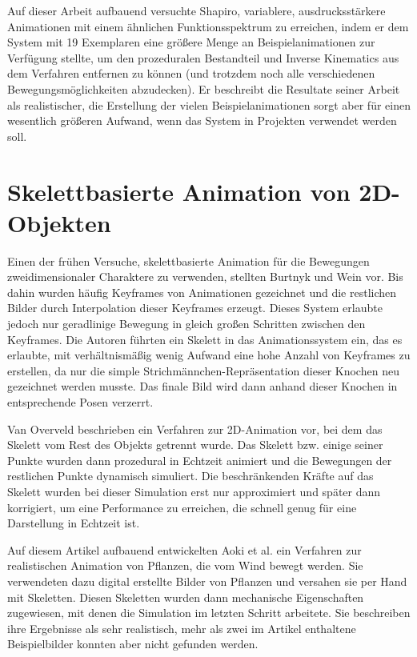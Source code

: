 Auf dieser Arbeit aufbauend versuchte Shapiro\cite{shapiro2011building}, variablere, ausdrucksstärkere Animationen mit einem ähnlichen Funktionsspektrum zu erreichen, indem er dem System mit 19 Exemplaren eine größere Menge an Beispielanimationen zur Verfügung stellte, um den prozeduralen Bestandteil und Inverse Kinematics aus dem Verfahren entfernen zu können (und trotzdem noch alle verschiedenen Bewegungsmöglichkeiten abzudecken). Er beschreibt die Resultate seiner Arbeit als realistischer, die Erstellung der vielen Beispielanimationen sorgt aber für einen wesentlich größeren Aufwand, wenn das System in Projekten verwendet werden soll.

\section{Skelettbasierte Animation von 2D-Objekten}
Einen der frühen Versuche, skelettbasierte Animation für die Bewegungen zweidimensionaler Charaktere zu verwenden, stellten Burtnyk und Wein\cite{burtnyk1976interactive} vor. Bis dahin wurden häufig Keyframes von Animationen gezeichnet und die restlichen Bilder durch Interpolation dieser Keyframes erzeugt. Dieses System erlaubte jedoch nur geradlinige Bewegung in gleich großen Schritten zwischen den Keyframes. Die Autoren führten ein Skelett in das Animationssystem ein, das es erlaubte, mit verhältnismäßig wenig Aufwand eine hohe Anzahl von Keyframes zu erstellen, da nur die simple Strichmännchen-Repräsentation dieser Knochen neu gezeichnet werden musste. Das finale Bild wird dann anhand dieser Knochen in entsprechende Posen verzerrt.

Van Overveld\cite{van1990technique} beschrieben ein Verfahren zur 2D-Animation vor, bei dem das Skelett vom Rest des Objekts getrennt wurde. Das Skelett bzw. einige seiner Punkte wurden dann prozedural in Echtzeit animiert und die Bewegungen der restlichen Punkte dynamisch simuliert. Die beschränkenden Kräfte auf das Skelett wurden bei dieser Simulation erst nur approximiert und später dann korrigiert, um eine Performance zu erreichen, die schnell genug für eine Darstellung in Echtzeit ist.

Auf diesem Artikel aufbauend entwickelten Aoki et al.\cite{aoki1999dynamic} ein Verfahren zur realistischen Animation von Pflanzen, die vom Wind bewegt werden. Sie verwendeten dazu digital erstellte Bilder von Pflanzen und versahen sie per Hand mit Skeletten. Diesen Skeletten wurden dann mechanische Eigenschaften zugewiesen, mit denen die Simulation im letzten Schritt arbeitete. Sie beschreiben ihre Ergebnisse als sehr realistisch, mehr als zwei im Artikel enthaltene Beispielbilder konnten aber nicht gefunden werden.

